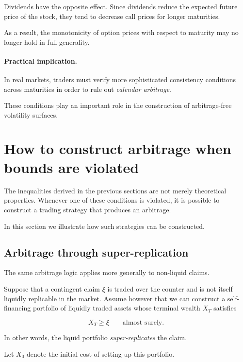 \documentclass[11pt]{article}
\newcommand{\1}{\mathbf{1}}
\theoremstyle{plain}
\theoremstyle{definition}
\theoremstyle{remark}
\begin{document}
Dividends have the opposite effect.
Since dividends reduce the expected future price of the stock,
they tend to decrease call prices for longer maturities.

As a result, the monotonicity of option prices with respect to maturity
may no longer hold in full generality.

\paragraph{Practical implication.}

In real markets, traders must verify more sophisticated consistency
conditions across maturities in order to rule out
\emph{calendar arbitrage}.

These conditions play an important role in the construction of
arbitrage-free volatility surfaces.

\section{How to construct arbitrage when bounds are violated}

The inequalities derived in the previous sections are not merely
theoretical properties.
Whenever one of these conditions is violated, it is possible to construct
a trading strategy that produces an arbitrage.

In this section we illustrate how such strategies can be constructed.

\subsection{Arbitrage through super-replication}

The same arbitrage logic applies more generally to non-liquid claims.

Suppose that a contingent claim \(\xi\) is traded over the counter and is
not itself liquidly replicable in the market.
Assume however that we can construct a self-financing portfolio of liquidly
traded assets whose terminal wealth \(X_T\) satisfies

\[
X_T \ge \xi
\qquad\text{almost surely.}
\]

In other words, the liquid portfolio \emph{super-replicates} the claim.

Let \(X_0\) denote the initial cost of setting up this portfolio.
\end{document}
